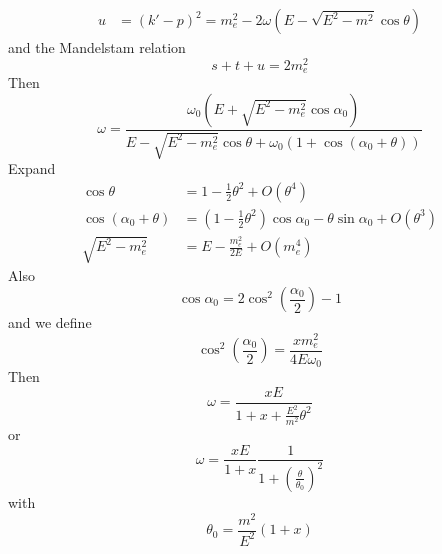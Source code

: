 \documentclass[12pt,a4paper]{article}
\begin{document}
\begin{empfile}
\begin{subequations}
\begin{align}
  u &= (k'-p)^2 = m_e^2 - 2\omega(E-\sqrt{E^2-m^2}\cos\theta)
\end{align}
\end{subequations}
and the Mandelstam relation
\begin{equation}
  s + t + u = 2m_e^2
\end{equation}
Then
\begin{equation}
 \omega =
   \frac{\omega_0(E+\sqrt{E^2-m_e^2}\cos\alpha_0)}
        {E-\sqrt{E^2-m_e^2}\cos\theta+\omega_0(1+\cos(\alpha_0+\theta))}
\end{equation}
Expand
\begin{subequations}
\begin{align}
  \cos\theta &= 1 - \frac{1}{2}\theta^2 + O(\theta^4) \\
  \cos(\alpha_0+\theta) &=
    \left(1 - \frac{1}{2}\theta^2\right)\cos\alpha_0 - \theta\sin\alpha_0
       + O(\theta^3) \\
  \sqrt{E^2-m_e^2} &= E - \frac{m_e^2}{2E} + O(m_e^4)
\end{align}
\end{subequations}
Also
\begin{equation}
  \cos\alpha_0 = 2\cos^2\left(\frac{\alpha_0}{2}\right) - 1
\end{equation}
and we define
\begin{equation}
  \cos^2\left(\frac{\alpha_0}{2}\right) = \frac{xm_e^2}{4E\omega_0}
\end{equation}
Then
\begin{equation}
 \omega = \frac{xE}{1 + x + \frac{E^2}{m^2}\theta^2}
\end{equation}
or
\begin{equation}
 \omega = \frac{xE}{1 + x} \frac{1}{1 + \left(\frac{\theta}{\theta_0}\right)^2}
\end{equation}
with
\begin{equation}
  \theta_0 = \frac{m^2}{E^2}(1+x)
\end{equation}

\end{empfile}
\end{document}
